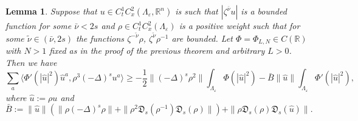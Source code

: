 \documentclass{article}
\numberwithin{equation}{section}
\newcommand{\assign}{:=}
\theoremstyle{plain}
\newtheorem{lemma}[theorem]{Lemma}
\theoremstyle{definition}
\begin{document}
\begin{lemma}
  \label{lem:est-apriori-laplacian}Suppose that $u \in C_t^1 C_x^2
  (\Lambda_{\varepsilon}, \mathbb{R}^n)$ is such that $| \zeta^{\bar{\nu}} u
  |$ is a bounded function for some $\bar{\nu} < 2 s$ and $\rho \in C_t^1
  C_x^2 (\Lambda_{\varepsilon})$ is a positive weight such that for some
  $\tilde{\nu} \in (\bar{\nu}, 2 s)$ the functions $\zeta^{- \tilde{\nu}}
  \rho$, $\zeta^{\tilde{\nu}} \rho^{- 1}$ are bounded. Let $\Phi = \Phi_{L, N}
  \in C (\mathbb{R})$ with $N > 1$ fixed as in the proof of the previous theorem
  and arbitrary $L > 0$. Then we have
  \[ \sum_a \langle \Phi' (| \hat{u} |^2)  \hat{u}^a, \rho^3  (- \Delta)^s u^a
     \rangle \geqslant - \frac{1}{2} \| (- \Delta)^s \rho^2 \|
     \int_{\Lambda_{\varepsilon}} \Phi (| \hat{u} |^2) -
     \bar{B}  \| \hat{u} \|  \int_{\Lambda_{\varepsilon}}
     \Phi' (| \hat{u} |^2) , \]
  where $\hat{u} \assign \rho u$ and
  \[ \bar{B} \assign \| \hat{u} \|  (\| \rho  (- \Delta)^s
     \rho \| + \| \rho^2 \mathfrak{D}_s (\rho^{- 1}) \mathfrak{D}_s (\rho) \|)
     + \| \rho  \mathfrak{D}_s (\rho) \mathfrak{D}_s (\hat{u}) \| . \]
\end{lemma}
\end{document}

